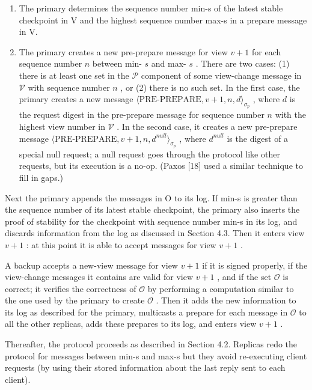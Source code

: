 \documentclass[
]{article}
\begin{document}
\begin{enumerate}
\def\labelenumi{\arabic{enumi}.}
\item
  The primary determines the sequence number min-s of the latest stable
  checkpoint in V and the highest sequence number max-s in a prepare
  message in V.
\item
  The primary creates a new pre-prepare message for view \(v + 1\) for
  each sequence number \(n\) between min- \(s\) and max- \(s\) . There
  are two cases: (1) there is at least one set in the \(\mathcal{P}\)
  component of some view-change message in \(\mathcal{V}\) with sequence
  number \(n\) , or (2) there is no such set. In the first case, the
  primary creates a new message
  \(\langle \text{PRE-PREPARE}, v + 1, n, d \rangle_{\sigma_p}\) , where
  \(d\) is the request digest in the pre-prepare message for sequence
  number \(n\) with the highest view number in \(\mathcal{V}\) . In the
  second case, it creates a new pre-prepare message
  \(\langle \text{PRE-PREPARE}, v + 1, n, d^{null} \rangle_{\sigma_p}\)
  , where \(d^{null}\) is the digest of a special null request; a null
  request goes through the protocol like other requests, but its
  execution is a no-op. (Paxos {[}18{]} used a similar technique to fill
  in gaps.)
\end{enumerate}

Next the primary appends the messages in O to its log. If min-s is
greater than the sequence number of its latest stable checkpoint, the
primary also inserts the proof of stability for the checkpoint with
sequence number min-s in its log, and discards information from the log
as discussed in Section 4.3. Then it enters view \(v+1\) : at this point
it is able to accept messages for view \(v+1\) .

A backup accepts a new-view message for view \(v + 1\) if it is signed
properly, if the view-change messages it contains are valid for view
\(v + 1\) , and if the set \(\mathcal{O}\) is correct; it verifies the
correctness of \(\mathcal{O}\) by performing a computation similar to
the one used by the primary to create \(\mathcal{O}\) . Then it adds the
new information to its log as described for the primary, multicasts a
prepare for each message in \(\mathcal{O}\) to all the other replicas,
adds these prepares to its log, and enters view \(v + 1\) .

Thereafter, the protocol proceeds as described in Section 4.2. Replicas
redo the protocol for messages between min-s and max-s but they avoid
re-executing client requests (by using their stored information about
the last reply sent to each client).
\end{document}
